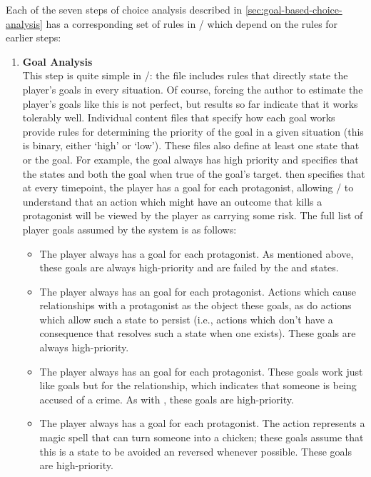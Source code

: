 Each of the seven steps of choice analysis described in \cref{sec:goal-based-choice-analysis} has a corresponding set of rules in \dunyazad/ which depend on the rules for earlier steps:
%
\begin{enumerate}
\item %
\textbf{Goal Analysis} \\
%
This step is quite simple in \dunyazad/: the file  includes rules that directly state the player's goals in every situation.
%
Of course, forcing the author to estimate the player's goals like this is not perfect, but results so far indicate that it works tolerably well.
%
Individual content files that specify how each goal works provide rules for determining the priority of the goal in a given situation (this is binary, either `high' or `low').
%
These files also define at least one state that    or  the goal.
%
For example, the  goal always has high priority and specifies that the states  and  both  the goal when true of the goal's target.
%
 then specifies that at every timepoint, the player has a  goal for each protagonist, allowing \dunyazad/ to understand that an action which might have an outcome that kills a protagonist will be viewed by the player as carrying some risk.
%
The full list of player goals assumed by the system is as follows:
%
\begin{itemize}
\item The player always has a  goal for each protagonist. As mentioned above, these goals are always high-priority and are failed by the  and  states.
\item The player always has an  goal for each protagonist. Actions which cause  relationships with a protagonist as the object  these goals, as do actions which allow such a state to persist (i.e., actions which don't have a consequence that resolves such a state when one exists). These goals are always high-priority.
\item The player always has an  goal for each protagonist. These goals work just like  goals but for the  relationship, which indicates that someone is being accused of a crime. As with , these goals are high-priority.
\item The player always has a  goal for each protagonist. The  action represents a magic spell that can turn someone into a chicken; these goals assume that this is a state to be avoided an reversed whenever possible. These goals are high-priority.

\end{itemize}
\end{enumerate}
